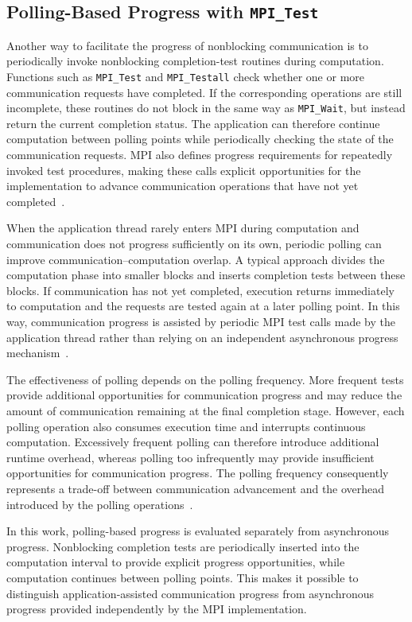 \subsection{Polling-Based Progress with \texttt{MPI\_Test}}

Another way to facilitate the progress of nonblocking communication is to periodically invoke nonblocking completion-test routines during computation. Functions such as \texttt{MPI\_Test} and \texttt{MPI\_Testall} check whether one or more communication requests have completed. If the corresponding operations are still incomplete, these routines do not block in the same way as \texttt{MPI\_Wait}, but instead return the current completion status. The application can therefore continue computation between polling points while periodically checking the state of the communication requests. MPI also defines progress requirements for repeatedly invoked test procedures, making these calls explicit opportunities for the implementation to advance communication operations that have not yet completed~\cite[Secs.~3.9, 4.7.3--4.7.5]{mpi50}.

When the application thread rarely enters MPI during computation and communication does not progress sufficiently on its own, periodic polling can improve communication--computation overlap. A typical approach divides the computation phase into smaller blocks and inserts completion tests between these blocks. If communication has not yet completed, execution returns immediately to computation and the requests are tested again at a later polling point. In this way, communication progress is assisted by periodic MPI test calls made by the application thread rather than relying on an independent asynchronous progress mechanism~\cite{mpiProgressGuidelines}.

The effectiveness of polling depends on the polling frequency. More frequent tests provide additional opportunities for communication progress and may reduce the amount of communication remaining at the final completion stage. However, each polling operation also consumes execution time and interrupts continuous computation. Excessively frequent polling can therefore introduce additional runtime overhead, whereas polling too infrequently may provide insufficient opportunities for communication progress. The polling frequency consequently represents a trade-off between communication advancement and the overhead introduced by the polling operations~\cite[Sec.~2.4]{zhou2024mpiProgressForAll}.

In this work, polling-based progress is evaluated separately from asynchronous progress. Nonblocking completion tests are periodically inserted into the computation interval to provide explicit progress opportunities, while computation continues between polling points. This makes it possible to distinguish application-assisted communication progress from asynchronous progress provided independently by the MPI implementation.




